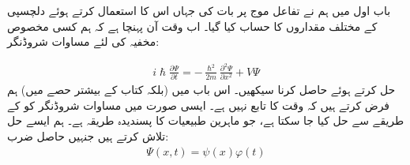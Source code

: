 

باب اول میں ہم نے تفاعل موج پر بات کی جہاں اس کا استعمال کرتے ہوئے دلچسپی کے مختلف مقداروں کا حساب کیا گیا۔ اب وقت آن پہنچا ہے کہ ہم کسی مخصوص مخفیہ  کی لئے مساوات شروڈنگر:

\begin{align}\label{مساوات_شروڈنگر_تابع_وقت}
i \hslash \frac{\partial \Psi}{\partial t} = - \frac{\hslash^{2}}{2 m} \frac{\partial^{2} \Psi}{\partial x^{2}} + V\Psi
\end{align}
 حل کرتے ہوئے  حاصل کرنا سیکھیں۔ اس باب میں (بلکہ کتاب کے بیشتر حصے میں) ہم فرض کرتے ہیں کہ  وقت  کا تابع نہیں ہے۔ ایسی صورت میں مساوات شروڈنگر کو  کے طریقے سے حل کیا جا سکتا ہے، جو ماہرین طبیعیات کا پسندیدہ طریقہ ہے۔ ہم ایسے حل تلاش کرتے ہیں جنہیں حاصل ضرب:
\begin{align}
\Psi (x,t) = \psi (x) \varphi (t)
\end{align}

